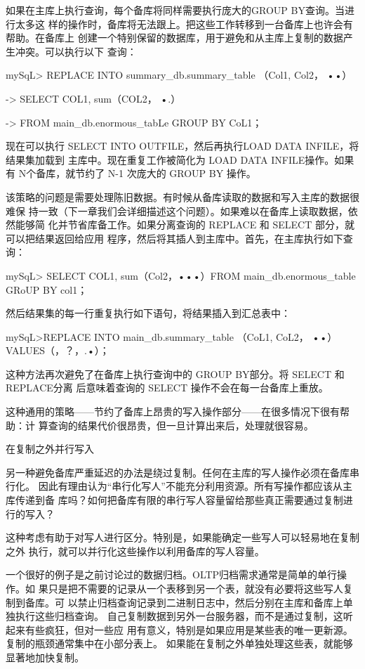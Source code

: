 如果在主库上执行查询，每个备库将同样需要执行庞大的GROUP BY查询。当进行太多这
样的操作时，备库将无法跟上。把这些工作转移到一台备库上也许会有帮助。在备库上
创建一个特别保留的数据库，用于避免和从主库上复制的数据产生冲突。可以执行以下
查询：

mySqL> REPLACE INTO summary\_db.summary\_table （Col1, Col2， ••）

-> SELECT COL1, sum（COL2， •.）

-> FROM main\_db.enormous\_tabLe GROUP BY CoL1；

现在可以执行 SELECT INTO OUTFILE，然后再执行LOAD DATA INFILE，将结果集加载到
主库中。现在重复工作被简化为 LOAD DATA INFILE操作。如果有 N个备库，就节约了
N-1 次庞大的 GROUP BY 操作。

该策略的问题是需要处理陈旧数据。有时候从备库读取的数据和写入主库的数据很难保
持一致（下一章我们会详细描述这个问题）。如果难以在备库上读取数据，依然能够简
化并节省库备工作。如果分离查询的 REPLACE 和 SELECT 部分，就可以把结果返回给应用
程序，然后将其插人到主库中。首先，在主库执行如下查询：

mySqL> SELECT COL1, sum（Col2，•••）FROM main\_db.enormous\_table GRoUP BY col1；

然后结果集的每一行重复执行如下语句，将结果插入到汇总表中：

mySqL>REPLACE INTO main\_db.summary\_table （CoL1, CoL2， ••） VALUES（，？，.•）；

这种方法再次避免了在备库上执行查询中的 GROUP BY部分。将 SELECT 和 REPLACE分离
后意味着查询的 SELECT 操作不会在每一台备库上重放。

这种通用的策略——节约了备库上昂贵的写入操作部分——在很多情况下很有帮助：计
算查询的结果代价很昂贵，但一旦计算出来后，处理就很容易。

在复制之外并行写入

另一种避免备库严重延迟的办法是绕过复制。任何在主库的写人操作必须在备库串行化。
因此有理由认为“串行化写人”不能充分利用资源。所有写操作都应该从主库传递到备
库吗？如何把备库有限的串行写人容量留给那些真正需要通过复制进行的写入？

这种考虑有助于对写人进行区分。特别是，如果能确定一些写人可以轻易地在复制之外
执行，就可以并行化这些操作以利用备库的写人容量。

一个很好的例子是之前讨论过的数据归档。OLTP归档需求通常是简单的单行操作。如
果只是把不需要的记录从一个表移到另一个表，就没有必要将这些写人复制到备库。可
以禁止归档查询记录到二进制日志中，然后分别在主库和备库上单独执行这些归档查询。
自己复制数据到另外一台服务器，而不是通过复制，这听起来有些疯狂，但对一些应
用有意义，特别是如果应用是某些表的唯一更新源。复制的瓶颈通常集中在小部分表上。
如果能在复制之外单独处理这些表，就能够显著地加快复制。

